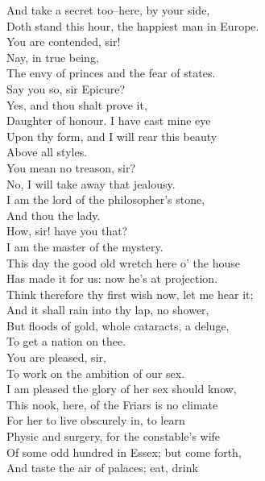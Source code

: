 \documentclass{memoir}
\begin{document}
\begin{drama*}
 And take a secret too--here, by your side,\\
 Doth stand this hour, the happiest man in Europe.\\
\dolspeaks  You are contended, sir!\\
\mammonspeaks {} Nay, in true being,\\
 The envy of princes and the fear of states.\\
\dolspeaks  Say you so, sir Epicure?\\
\mammonspeaks {} Yes, and thou shalt prove it,\\
 Daughter of honour. I have cast mine eye\\
 Upon thy form, and I will rear this beauty\\
 Above all styles.\\
\dolspeaks {} You mean no treason, sir?\\
\mammonspeaks  No, I will take away that jealousy.\\
 I am the lord of the philosopher's stone,\\
 And thou the lady.\\
\dolspeaks {} How, sir! have you that?\\
\mammonspeaks  I am the master of the mystery.\\
 This day the good old wretch here o' the house\\
 Has made it for us: now he's at projection.\\
 Think therefore thy first wish now, let me hear it;\\
 And it shall rain into thy lap, no shower,\\
 But floods of gold, whole cataracts, a deluge,\\
 To get a nation on thee.\\
\dolspeaks {} You are pleased, sir,\\
 To work on the ambition of our sex.\\
\mammonspeaks  I am pleased the glory of her sex should know,\\
 This nook, here, of the Friars is no climate\\
 For her to live obscurely in, to learn\\
 Physic and surgery, for the constable's wife\\
 Of some odd hundred in Essex; but come forth,\\
 And taste the air of palaces; eat, drink\\

\end{drama*}
\end{document}
